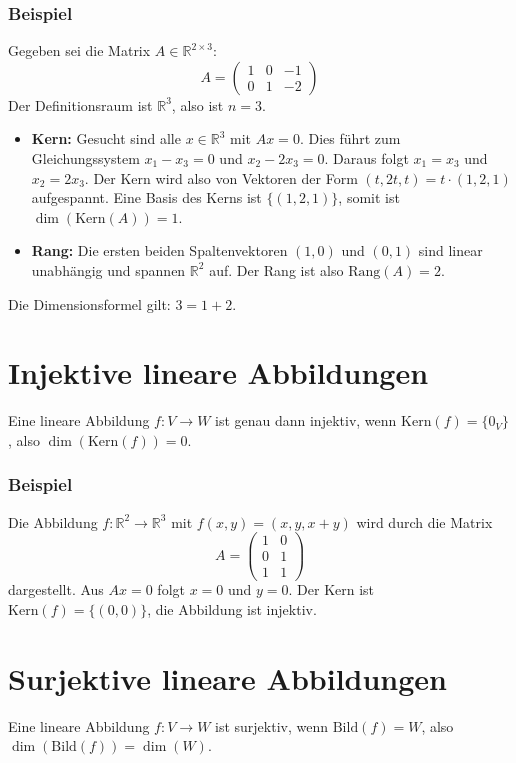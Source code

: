 \subsubsection{Beispiel}
Gegeben sei die Matrix \(A \in \mathbb{R}^{2 \times 3}\):
\[
    A = \begin{pmatrix} 1 & 0 & -1 \\ 0 & 1 & -2 \end{pmatrix}
\]
Der Definitionsraum ist \(\mathbb{R}^3\), also ist \(n=3\).
\begin{itemize}
    \item \textbf{Kern:} Gesucht sind alle \(x \in \mathbb{R}^3\) mit \(Ax=0\). Dies führt zum Gleichungssystem \(x_1 - x_3 = 0\) und \(x_2 - 2x_3 = 0\). Daraus folgt \(x_1 = x_3\) und \(x_2 = 2x_3\). Der Kern wird also von Vektoren der Form \((t, 2t, t) = t \cdot (1, 2, 1)\) aufgespannt. Eine Basis des Kerns ist \(\{(1, 2, 1)\}\), somit ist \(\dim(\mathrm{Kern}(A)) = 1\).
    \item \textbf{Rang:} Die ersten beiden Spaltenvektoren \((1,0)\) und \((0,1)\) sind linear unabhängig und spannen \(\mathbb{R}^2\) auf. Der Rang ist also \(\mathrm{Rang}(A) = 2\).
\end{itemize}
Die Dimensionsformel gilt: \(3 = 1 + 2\).

\section{Injektive lineare Abbildungen}
Eine lineare Abbildung \(f: V \to W\) ist genau dann injektiv, wenn \(\mathrm{Kern}(f) = \{0_V\}\), also \(\dim(\mathrm{Kern}(f)) = 0\).

\subsubsection{Beispiel}
Die Abbildung \(f: \mathbb{R}^2 \to \mathbb{R}^3\) mit \(f(x,y) = (x, y, x+y)\) wird durch die Matrix
\[
    A = \begin{pmatrix} 1 & 0 \\ 0 & 1 \\ 1 & 1 \end{pmatrix}
\]
dargestellt. Aus \(Ax=0\) folgt \(x=0\) und \(y=0\). Der Kern ist \(\mathrm{Kern}(f) = \{(0,0)\}\), die Abbildung ist injektiv.

\section{Surjektive lineare Abbildungen}
Eine lineare Abbildung \(f: V \to W\) ist surjektiv, wenn \(\mathrm{Bild}(f) = W\), also \(\dim(\mathrm{Bild}(f)) = \dim(W)\).

